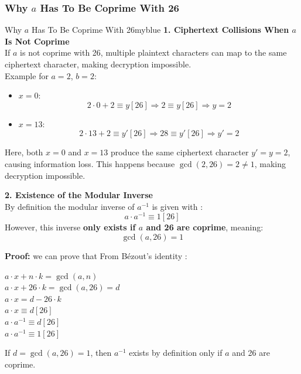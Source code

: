 \subsubsection{Why \(a\) Has To Be Coprime With 26}
\begin{prettyBox}{Why \(a\) Has To Be Coprime With 26}{myblue}
\textbf{1. Ciphertext Collisions When \( a \) Is Not Coprime}\\[0.15cm]
If \( a \) is not coprime with 26, multiple plaintext characters can map to the same ciphertext character, making decryption impossible.\\[0.1cm]
Example for \( a = 2 \), \( b = 2 \):

\begin{itemize}
    \item \( x = 0 \):
        \[
            2 \cdot 0 + 2 \equiv y [26] \Rightarrow 2 \equiv y [26] \Rightarrow \boxed{y = 2}
        \]
    \item \( x = 13 \):
        \[
            2 \cdot 13 + 2 \equiv y' [26] \Rightarrow 28 \equiv y' [26] \Rightarrow \boxed{y' = 2}
        \]
\end{itemize}

Here, both \( x = 0 \) and \( x = 13 \) produce the same ciphertext character \( y' = y = 2 \), causing information loss.  
This happens because \( \gcd(2, 26) = 2 \neq 1 \), making decryption impossible.

\vspace{0.75cm}

\textbf{2. Existence of the Modular Inverse}\\[0.15cm]
By definition the modular inverse of \(a^{-1}\) is given with :
\[
    a \cdot a^{-1} \equiv 1 [26]
\]
However, this inverse \textbf{only exists if \( a \) and 26 are coprime}, meaning:
\[
\gcd(a, 26) = 1
\]

\textbf{Proof:} we can prove that From Bézout’s identity :

\begin{center}
    \(a \cdot x + n \cdot k = \gcd(a,n)\)\\[0.13cm]
    \(a \cdot x + 26 \cdot k = \gcd(a,26) = d\)\\[0.13cm] 
    \(a \cdot x = d - 26 \cdot k \)\\[0.13cm]
    \(a \cdot x \equiv d [26]\)\\[0.13cm]
    \(a \cdot a^{-1} \equiv d [26]\)\\[0.13cm]
    \(a \cdot a^{-1} \equiv 1 [26]\)\\[0.13cm]
\end{center}

If \( d = \gcd(a, 26) =  1 \), then \(a^{-1}\) exists by definition only if \(a\) and 26 are coprime. 
\end{prettyBox}

